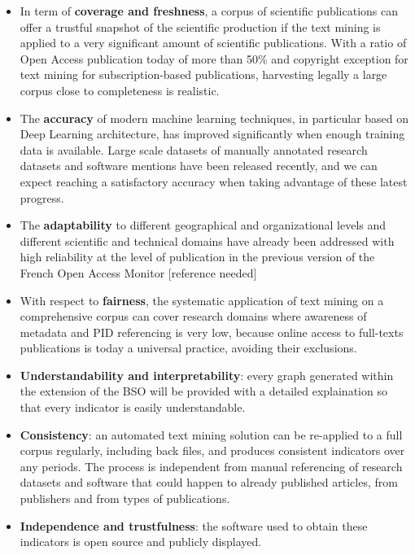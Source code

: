 \documentclass[
]{article}
\begin{document}
\begin{itemize}
\item
  In term of \textbf{coverage and freshness}, a corpus of scientific
  publications can offer a trustful snapshot of the scientific
  production if the text mining is applied to a very significant amount
  of scientific publications. With a ratio of Open Access publication
  today of more than 50\% and copyright exception for text mining for
  subscription-based publications, harvesting legally a large corpus
  close to completeness is realistic.
\item
  The \textbf{accuracy} of modern machine learning techniques, in
  particular based on Deep Learning architecture, has improved
  significantly when enough training data is available. Large scale
  datasets of manually annotated research datasets and software mentions
  have been released recently, and we can expect reaching a satisfactory
  accuracy when taking advantage of these latest progress.
\item
  The \textbf{adaptability} to different geographical and organizational
  levels and different scientific and technical domains have already
  been addressed with high reliability at the level of publication in
  the previous version of the French Open Access Monitor {[}reference
  needed{]}
\item
  With respect to \textbf{fairness}, the systematic application of text
  mining on a comprehensive corpus can cover research domains where
  awareness of metadata and PID referencing is very low, because online
  access to full-texts publications is today a universal practice,
  avoiding their exclusions.
\item
  \textbf{Understandability and interpretability}: every graph generated
  within the extension of the BSO will be provided with a detailed
  explaination so that every indicator is easily understandable.
\item
  \textbf{Consistency}: an automated text mining solution can be
  re-applied to a full corpus regularly, including back files, and
  produces consistent indicators over any periods. The process is
  independent from manual referencing of research datasets and software
  that could happen to already published articles, from publishers and
  from types of publications.
\item
  \textbf{Independence and trustfulness}: the software used to obtain
  these indicators is open source and publicly displayed.
\end{itemize}
\end{document}
